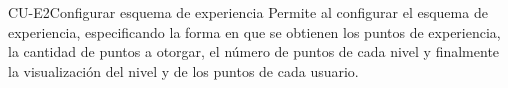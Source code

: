 
%

\begin{UseCase}%
%
{CU-E2}{Configurar esquema de experiencia}{%
%
 Permite al  configurar el esquema de experiencia, especificando
 la forma en que se obtienen los puntos de experiencia, la cantidad de puntos a otorgar, 
 el número de puntos de cada nivel y finalmente la visualización del nivel y de los puntos
 de cada usuario.}




	
	

\end{UseCase}
